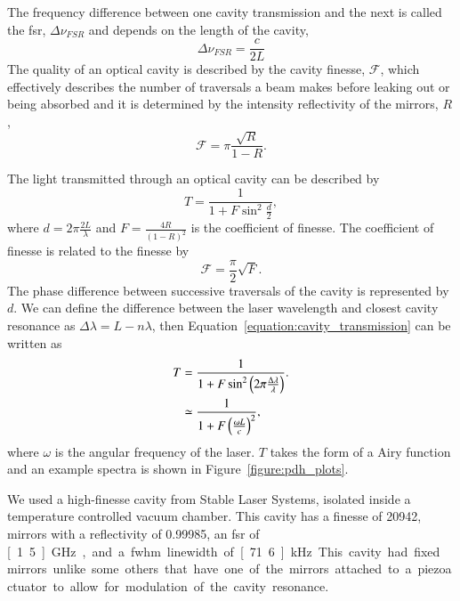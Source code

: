 The frequency difference between one cavity transmission and the next is called the \gls{fsr}, $\Delta \nu_{FSR}$ and depends on the length of the cavity,
\begin{equation}
\Delta \nu_{FSR} = \frac{c}{2L}
\end{equation}
The quality of an optical cavity is described by the cavity finesse, $\mathscr{F}$, which effectively describes the number of traversals a beam makes before leaking out or being absorbed and it is determined by the intensity reflectivity of the mirrors, $R$,~\cite{hecht_optics_1987}
\begin{equation}
\mathscr{F} = \pi\frac{\sqrt{R}}{1-R}.
\end{equation}

The light transmitted through an optical cavity can be described by~\cite{pedrotti_introduction_2007}
\begin{equation}\label{equation:cavity_transmission}
T = \frac{1}{1+F\sin^2\frac{d}{2}},
\end{equation}
where $d=2\pi\frac{2L}{\lambda}$ and $F=\frac{4R}{\left(1-R\right)^2}$ is the coefficient of finesse.
The coefficient of finesse is related to the finesse by
\begin{equation}
\mathscr{F}=\frac{\pi}{2}\sqrt{F}.
\end{equation}
The phase difference between successive traversals of the cavity is represented by $d$.
We can define the difference between the laser wavelength and closest cavity resonance as $\Delta\lambda=L-n\lambda$, then Equation~\ref{equation:cavity_transmission} can be written as
\begin{align}\label{equation:cavity_transmission2}
T &= \frac{1}{1+F\sin^2\left(2\pi\frac{\Delta\lambda}{\lambda}\right)}. \notag \\
&\simeq \frac{1}{1+F\left(\frac{\omega L}{c}\right)^2},
\end{align}
where $\omega$ is the angular frequency of the laser.
$T$ takes the form of a Airy function and an example spectra is shown in Figure~\ref{figure:pdh_plots}.

We used a high-finesse cavity from Stable Laser Systems, isolated inside a temperature controlled vacuum chamber.
This cavity has a finesse of 20942, mirrors with a reflectivity of 0.99985, an \gls{fsr} of \unit[1.5]{GHz}, and a \gls{fwhm} linewidth of \unit[71.6]{kHz}.
This cavity had fixed mirrors unlike some others that have one of the mirrors attached to a piezoactuator to allow for modulation of the cavity resonance.

